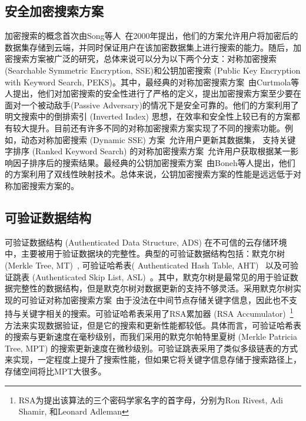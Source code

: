 \subsection{安全加密搜索方案}
加密搜索的概念首次由Song等人~\cite{song2000practical}在2000年提出，他们的方案允许用户将加密后的数据集存储到云端，并同时保证用户在该加密数据集上进行搜索的能力。随后，加密搜索方案被广泛的研究，总体来说可以分为以下两个分支：对称加密搜索 (Searchable Symmetric Encryption, SSE)和公钥加密搜索 (Public Key Encryption with Keyword Search, PEKS)。其中，最经典的对称加密搜索方案~\cite{curtmola2011searchable}由Curtmola等人提出，他们对加密搜索的安全性进行了严格的定义，提出加密搜索方案至少要在面对一个被动敌手(Passive Adversary)的情况下是安全可靠的。他们的方案利用了明文搜索中的倒排索引 (Inverted Index) 思想，在效率和安全性上较已有的方案都有较大提升。目前还有许多不同的对称加密搜索方案实现了不同的搜索功能。例如，动态对称加密搜索 (Dynamic SSE) 方案~\cite{kamara2012dynamic,cash2014dynamic,stefanov2014practical}允许用户更新其数据集， 支持关键字排序 (Ranked Keyword Search) 的对称加密搜索方案~\cite{wang2010secure}允许用户获取根据某一影响因子排序后的搜索结果。最经典的公钥加密搜索方案~\cite{boneh2004public}由Boneh等人提出，他们的方案利用了双线性映射技术。总体来说，公钥加密搜索方案的性能是远远低于对称加密搜索方案的。


\subsection{可验证数据结构}
可验证数据结构 (Authenticated Data Structure, ADS) 在不可信的云存储环境中，主要被用于验证数据块的完整性。典型的可验证数据结构包括：默克尔树 (Merkle Tree, MT)~\cite{merkle1987digital}, 可验证哈希表( Authenticated Hash Table, AHT)~\cite{papamanthou2008authenticated} 以及可验证跳表 (Authenticated Skip List, ASL)~\cite{pugh1990skip,goodrich2001implementation}。其中，默克尔树是最常见的用于验证数据完整性的数据结构，但是默克尔树对数据更新的支持不够灵活。采用默克尔树实现的可验证对称加密搜索方案~\cite{kamara2011cs2}由于没法在中间节点存储关键字信息，因此也不支持与关键字相关的搜索。可验证哈希表采用了RSA累加器 (RSA Accumulator)~\footnote{RSA为提出该算法的三个密码学家名字的首字母，分别为Ron Rivest, Adi Shamir, 和Leonard Adleman}  方法来实现数据验证，但是它的搜索和更新性能都较低。具体而言，可验证哈希表的搜索与更新速度在毫秒级别，而我们采用的默克尔帕特里夏树 (Merkle Patricia Tree, MPT) 的搜索更新速度在微秒级别。可验证跳表采用了类似多级链表的方式来实现，一定程度上提升了搜索性能，但如果它将关键字信息存储于搜索路径上，存储空间将比MPT大很多。


